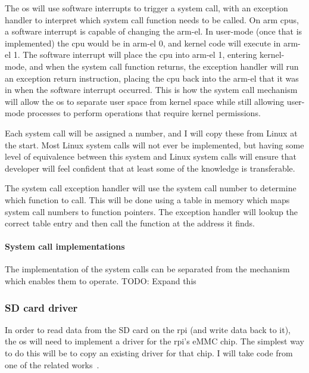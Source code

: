 \documentclass{article}
\begin{document}
The \gls{os} will use software interrupts to trigger a system call, with an
exception handler to interpret which system call function needs to be called.
On \gls{arm} \glspl{cpu}, a software interrupt is capable of changing the
\gls{arm-el}. In user-mode (once that is implemented) the \gls{cpu} would be in
\gls{arm-el} 0, and kernel code will execute in \gls{arm-el} 1. The software
interrupt will place the \gls{cpu} into \gls{arm-el} 1, entering kernel-mode,
and when the system call function returns, the exception handler will run an
exception return instruction, placing the \gls{cpu} back into the \gls{arm-el}
that it was in when the software interrupt occurred. This is how the system
call mechanism will allow the \gls{os} to separate user space from kernel space
while still allowing user-mode processes to perform operations that require
kernel permissions.

Each system call will be assigned a number, and I will copy these from Linux at
the start. Most Linux system calls will not ever be implemented, but having
some level of equivalence between this system and Linux system calls will
ensure that developer will feel confident that at least some of the knowledge
is transferable.

The system call exception handler will use the system call number to determine
which function to call. This will be done using a table in memory which maps
system call numbers to function pointers. The exception handler will lookup the
correct table entry and then call the function at the address it finds.

\paragraph{System call implementations}
The implementation of the system calls can be separated from the mechanism
which enables them to operate.
TODO: Expand this

\subsubsection{SD card driver}
In order to read data from the SD card on the \gls{rpi} (and write data back to
it), the \gls{os} will need to implement a driver for the \gls{rpi}'s eMMC
chip. The simplest way to do this will be to copy an existing driver for that
chip. I will take code from one of the related works~\cite{rpi-boot-gh}.
\end{document}
